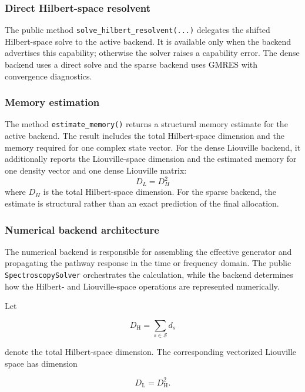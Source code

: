 \documentclass[11pt]{article}
\begin{document}
\subsubsection{Direct Hilbert-space resolvent}

The public method \texttt{solve\_hilbert\_resolvent(...)} delegates the shifted Hilbert-space solve to the active backend. It is available only when the backend advertises this capability; otherwise the solver raises a capability error. The dense backend uses a direct solve and the sparse backend uses GMRES with convergence diagnostics.


\subsubsection{Memory estimation}

The method \texttt{estimate\_memory()} returns a structural memory estimate for the active backend. The result includes the total Hilbert-space dimension and the memory required for one complex state vector. For the dense Liouville backend, it additionally reports the Liouville-space dimension and the estimated memory for one density vector and one dense Liouville matrix:
\begin{equation}
    D_L = D_H^2
\end{equation}
where $D_H$ is the total Hilbert-space dimension. For the sparse backend, the estimate is structural rather than an exact prediction of the final allocation.


\subsubsection{Numerical backend architecture}
\label{app:numerical-backends}

The numerical backend is responsible for assembling the effective generator
and propagating the pathway response in the time or frequency domain.
The public \texttt{SpectroscopySolver} orchestrates the calculation, while
the backend determines how the Hilbert- and Liouville-space operations are
represented numerically.

Let

\begin{equation}
D_{\mathrm{H}}
=
\sum_{s\in\mathcal{S}}d_s
\end{equation}

denote the total Hilbert-space dimension. The corresponding vectorized
Liouville space has dimension

\begin{equation}
D_{\mathrm{L}}
=
D_{\mathrm{H}}^2.
\end{equation}
\end{document}
